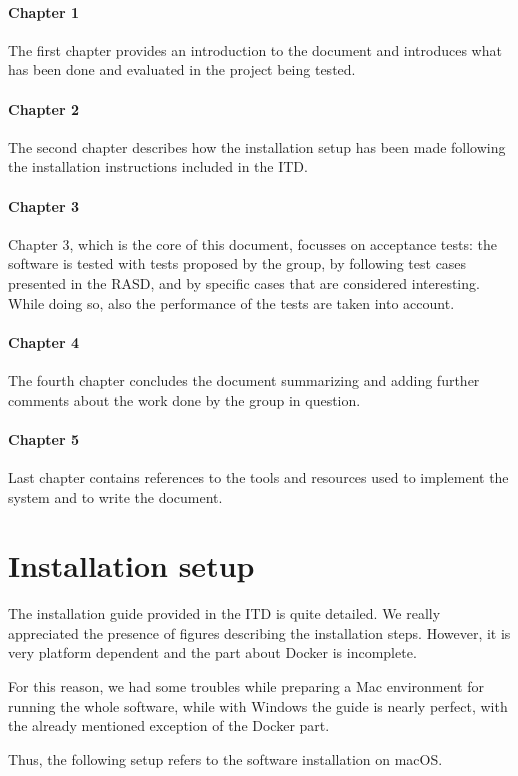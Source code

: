 \documentclass[a4paper,oneside,11pt]{book}
\begin{document}
    \subsubsection{Chapter 1}
    The first chapter provides an introduction to the document and introduces what has been done and evaluated in the project being tested.
    
    \subsubsection{Chapter 2}
    The second chapter describes how the installation setup has been made following the installation instructions included in the ITD. 

    \subsubsection{Chapter 3}
    Chapter 3, which is the core of this document, focusses on acceptance tests: the software is tested with tests proposed by the group, by following test cases presented in the RASD, and by specific cases that are considered interesting. While doing so, also the performance of the tests are taken into account.
    
    \subsubsection{Chapter 4}
    The fourth chapter concludes the document summarizing and adding further comments about the work done by the group in question.
    
    \subsubsection{Chapter 5}
    Last chapter contains references to the tools and resources used to implement the system and to write the document.
    
\chapter{Installation setup}
    The installation guide provided in the ITD is quite detailed. We really appreciated the presence of figures describing the installation steps. However, it is very platform dependent and the part about Docker is incomplete. \par For this reason, we had some troubles while preparing a Mac environment for running the whole software, while with Windows the guide is nearly perfect, with the already mentioned exception of the Docker part. \par
    Thus, the following setup refers to the software installation on macOS.
\end{document}
